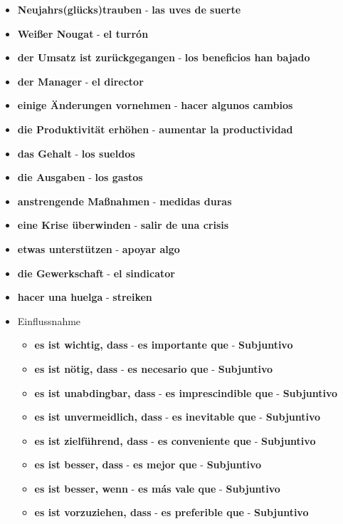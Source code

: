 \documentclass{article}
\begin{document}
\begin{multicols}{2}
\begin{itemize}
		\item{\textbf{Neujahrs(glücks)trauben} - \textbf{las uves de suerte}}
		\item{\textbf{Weißer Nougat} - \textbf{el turrón}}
		\item{\textbf{der Umsatz ist zurückgegangen} - \textbf{los beneficios han bajado}}
		\item{\textbf{der Manager} - \textbf{el director}}
		\item{\textbf{einige Änderungen vornehmen} - \textbf{hacer algunos cambios}}
		\item{\textbf{die Produktivität erhöhen} - \textbf{aumentar la productividad}}
		\item{\textbf{das Gehalt} - \textbf{los sueldos}}
		\item{\textbf{die Ausgaben} - \textbf{los gastos}}
		\item{\textbf{anstrengende Maßnahmen} - \textbf{medidas duras}}
		\item{\textbf{eine Krise überwinden} - \textbf{salir de una crisis}}
		\item{\textbf{etwas unterstützen} - \textbf{apoyar algo}}
		\item{\textbf{die Gewerkschaft} - \textbf{el sindicator}}
		\item{\textbf{hacer una huelga} - \textbf{streiken}}
	\end{itemize}
	\newpage
	\begin{itemize}
		\item{Einflussnahme}
		\begin{itemize}
			\item{\textbf{es ist wichtig, dass} - \textbf{es importante que} - \textbf{Subjuntivo}}
			\item{\textbf{es ist nötig, dass} - \textbf{es necesario que} - \textbf{Subjuntivo}}
			\item{\textbf{es ist unabdingbar, dass} - \textbf{es imprescindible que} - \textbf{Subjuntivo}}
			\item{\textbf{es ist unvermeidlich, dass} - \textbf{es inevitable que} - \textbf{Subjuntivo}}
			\item{\textbf{es ist zielführend, dass} - \textbf{es conveniente que} - \textbf{Subjuntivo}}
			\item{\textbf{es ist besser, dass} - \textbf{es mejor que} - \textbf{Subjuntivo}}
			\item{\textbf{es ist besser, wenn} - \textbf{es más vale que} - \textbf{Subjuntivo}}
			\item{\textbf{es ist vorzuziehen, dass} - \textbf{es preferible que} - \textbf{Subjuntivo}}

\end{itemize}
\end{itemize}
\end{multicols}
\end{document}
